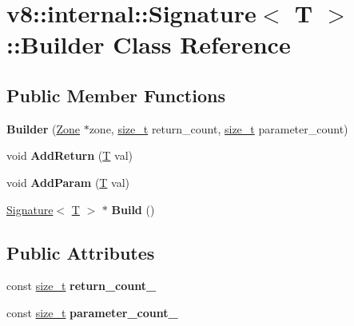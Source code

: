 \hypertarget{classv8_1_1internal_1_1Signature_1_1Builder}{}\section{v8\+:\+:internal\+:\+:Signature$<$ T $>$\+:\+:Builder Class Reference}
\label{classv8_1_1internal_1_1Signature_1_1Builder}
\subsection*{Public Member Functions}
\begin{DoxyCompactItemize}
\item 
\mbox{\label{classv8_1_1internal_1_1Signature_1_1Builder_ade96a4413bb2a2ddf53ac28245fda492}} 
{\bfseries Builder} (\mbox{\hyperlink{classv8_1_1internal_1_1Zone}{Zone}} $\ast$zone, \mbox{\hyperlink{classsize__t}{size\+\_\+t}} return\+\_\+count, \mbox{\hyperlink{classsize__t}{size\+\_\+t}} parameter\+\_\+count)
\item 
\mbox{\label{classv8_1_1internal_1_1Signature_1_1Builder_ad1096e6ebaad8fd6c7d497fa014f02c6}} 
void {\bfseries Add\+Return} (\mbox{\hyperlink{classv8_1_1internal_1_1torque_1_1T}{T}} val)
\item 
\mbox{\label{classv8_1_1internal_1_1Signature_1_1Builder_a00f65920a72a4b06fd3ac99be2a40fac}} 
void {\bfseries Add\+Param} (\mbox{\hyperlink{classv8_1_1internal_1_1torque_1_1T}{T}} val)
\item 
\mbox{\label{classv8_1_1internal_1_1Signature_1_1Builder_acb0ca8899529ab943d71625f920d406c}} 
\mbox{\hyperlink{classv8_1_1internal_1_1Signature}{Signature}}$<$ \mbox{\hyperlink{classv8_1_1internal_1_1torque_1_1T}{T}} $>$ $\ast$ {\bfseries Build} ()
\end{DoxyCompactItemize}
\subsection*{Public Attributes}
\begin{DoxyCompactItemize}
\item 
\mbox{\label{classv8_1_1internal_1_1Signature_1_1Builder_a009b50f011533c5ec1b96b1b7d967cb2}} 
const \mbox{\hyperlink{classsize__t}{size\+\_\+t}} {\bfseries return\+\_\+count\+\_\+}
\item 
\mbox{\label{classv8_1_1internal_1_1Signature_1_1Builder_a64e60fc499775603873cb2c3ee5ba501}} 
const \mbox{\hyperlink{classsize__t}{size\+\_\+t}} {\bfseries parameter\+\_\+count\+\_\+}
\end{DoxyCompactItemize}


